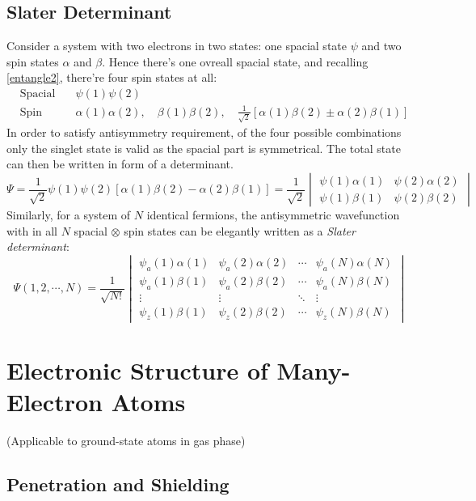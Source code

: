 \subsection{Slater Determinant}\label{slater det}

Consider a system with two electrons in two states: one spacial state $\psi$ and two spin states $\alpha$ and $\beta$.
Hence there's one ovreall spacial state, and recalling \ref{entangle2}, there're four spin states at all:
\[\begin{aligned}
&\text{Spacial part: }&\psi(1)\psi(2)\\
&\text{Spin part: }&\alpha(1)\alpha(2), \quad\beta(1)\beta(2), \quad\frac{1}{\sqrt{2}}[\alpha(1)\beta(2)\pm\alpha(2)\beta(1)]
\end{aligned}\]
In order to satisfy antisymmetry requirement, of the four possible combinations only the singlet state is valid as the spacial part is symmetrical.
The total state can then be written in form of a determinant.
\[
\Psi = \frac{1}{\sqrt{2}}\psi(1)\psi(2)[\alpha(1)\beta(2)-\alpha(2)\beta(1)] = 
\frac{1}{\sqrt{2}}
\begin{vmatrix}
\psi(1)\alpha(1) & \psi(2)\alpha(2) \\
\psi(1)\beta(1)  & \psi(2)\beta(2)
\end{vmatrix}
\]
Similarly, for a system of $N$ identical fermions, 
the antisymmetric wavefunction with in all $N$ spacial $\otimes$ spin states can be elegantly written as a \emph{Slater determinant}:
\[
    \Psi(1,2,\cdots,N) = \frac{1}{\sqrt{N!}}
    \begin{vmatrix}
        \psi_a(1)\alpha(1) & \psi_a(2)\alpha(2) & \cdots & \psi_a(N)\alpha(N) \\
        \psi_a(1)\beta(1)  & \psi_a(2)\beta(2)  & \cdots & \psi_a(N)\beta(N)  \\
        \vdots & \vdots & \ddots & \vdots \\
        \psi_z(1)\beta(1)  & \psi_z(2)\beta(2)  & \cdots & \psi_z(N)\beta(N)
    \end{vmatrix}
\]

\section{Electronic Structure of Many-Electron Atoms}
(Applicable to ground-state atoms in gas phase)

\subsection{Penetration and Shielding}

